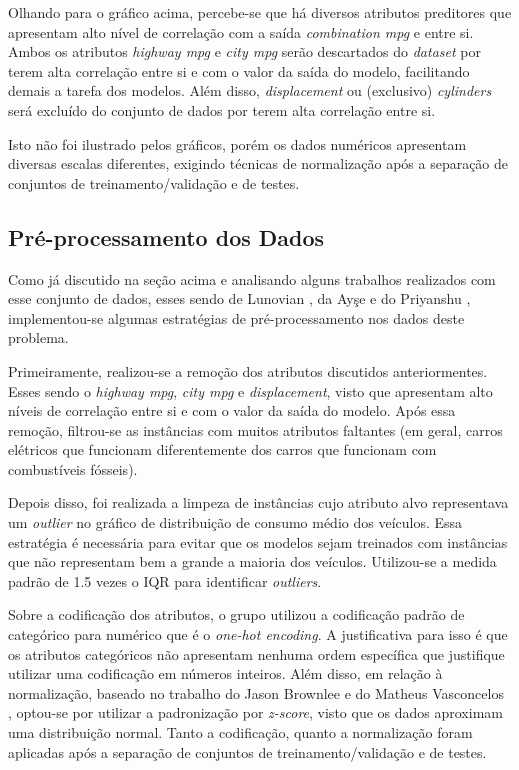 \documentclass{report}
\begin{document}
Olhando para o gráfico acima, percebe-se que há diversos atributos preditores que apresentam alto nível de correlação com a saída \textit{combination mpg} e entre si. Ambos os atributos
\textit{highway mpg} e \textit{city mpg} serão descartados do \textit{dataset} por terem alta correlação entre si e com o valor da saída do modelo, facilitando demais a tarefa dos modelos.
Além disso, \textit{displacement} ou (exclusivo) \textit{cylinders} será excluído do conjunto de dados por terem alta correlação entre si.

Isto não foi ilustrado pelos gráficos, porém os dados numéricos apresentam diversas escalas diferentes, exigindo técnicas de normalização após a separação de conjuntos de treinamento/validação
e de testes.

\subsection{Pré-processamento dos Dados}

Como já discutido na seção acima e analisando alguns trabalhos realizados com esse conjunto de dados, esses sendo de Lunovian \cite{Lunovian}, da Ayşe \cite{Ayşe} e do Priyanshu \cite{Priyanshu},
implementou-se algumas estratégias de pré-processamento nos dados deste problema.

Primeiramente, realizou-se a remoção dos atributos discutidos anteriormentes. Esses sendo o \textit{highway mpg}, \textit{city mpg} e \textit{displacement}, visto que apresentam alto níveis de
correlação entre si e com o valor da saída do modelo. Após essa remoção, filtrou-se as instâncias com muitos atributos faltantes (em geral, carros elétricos que funcionam diferentemente dos carros
que funcionam com combustíveis fósseis).

Depois disso, foi realizada a limpeza de instâncias cujo atributo alvo representava um \textit{outlier} no gráfico de distribuição de consumo médio dos veículos. Essa estratégia é necessária para
evitar que os modelos sejam treinados com instâncias que não representam bem a grande a maioria dos veículos. Utilizou-se a medida padrão de 1.5 vezes o IQR para identificar \textit{outliers}.

Sobre a codificação dos atributos, o grupo utilizou a codificação padrão de categórico para numérico que é o \textit{one-hot encoding}. A justificativa para isso é que os atributos categóricos não
apresentam nenhuma ordem específica que justifique utilizar uma codificação em números inteiros. Além disso, em relação à normalização, baseado no trabalho do Jason Brownlee \cite{ColumnTransformer} e
do Matheus Vasconcelos \cite{PadronizarDados}, optou-se por utilizar a padronização por \textit{z-score}, visto que os dados aproximam uma distribuição normal. Tanto a codificação, quanto a normalização
foram aplicadas após a separação de conjuntos de treinamento/validação e de testes.
\end{document}
